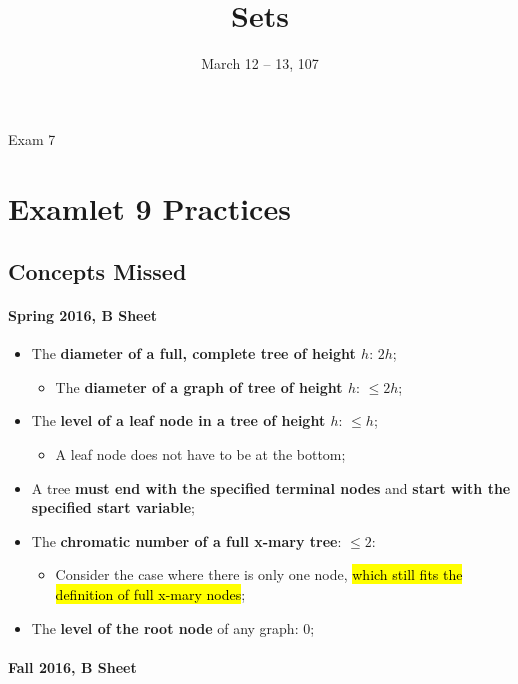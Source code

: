\documentclass{note}
\date{March 12 -- 13, 107}
\title{Sets}
\begin{document}
\begin{note}{Exam 7}

\section{Examlet 9 Practices}

    \subsection{Concepts Missed}

    \paragraph{Spring 2016, B Sheet}

    \begin{itemize}
        \item The \textbf{diameter of a full, complete tree of height $ h $}: $ 2h $;
        \begin{itemize}
            \item The \textbf{diameter of a graph of tree of height $ h $}: $ \leq 2h $;
        \end{itemize}

        \item The \textbf{level of a leaf node in a tree of height $ h $}: $ \leq h $;
        \begin{itemize}
            \item A leaf node does not have to be at the bottom;
        \end{itemize}

        \item A tree \textbf{must end with the specified terminal nodes} and \textbf{start with the specified start variable};

        \item The \textbf{chromatic number of a full x-mary tree}: $ \leq 2 $:
        \begin{itemize}
            \item Consider the case where there is only one node, \hl{which still fits the definition of full x-mary nodes};
        \end{itemize}

        \item The \textbf{level of the root node} of any graph: 0;
    \end{itemize}

    \paragraph{Fall 2016, B Sheet}


\end{note}
\end{document}
